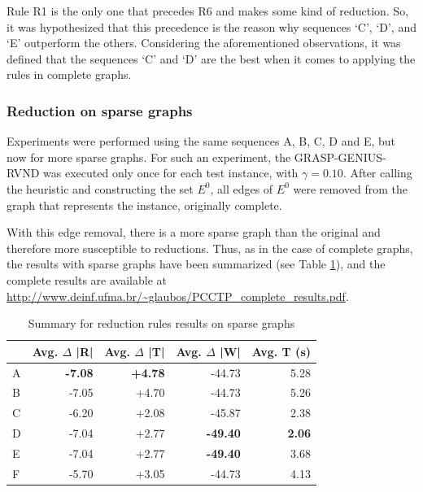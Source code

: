 \documentclass{singlecol-new}
\theoremstyle{TH}{
\newtheorem{lemma}{Lemma}
\newtheorem{theorem}[lemma]{Theorem}
\newtheorem{corrolary}[lemma]{Corrolary}
\newtheorem{conjecture}[lemma]{Conjecture}
\newtheorem{proposition}[lemma]{Proposition}
\newtheorem{claim}[lemma]{Claim}
\newtheorem{stheorem}[lemma]{Wrong Theorem}
}
\theoremstyle{THrm}{
\newtheorem{definition}{Definition}[section]
\newtheorem{question}{Question}[section]
\newtheorem{remark}{Remark}
\newtheorem{scheme}{Scheme}
}
\theoremstyle{THhit}{
\newtheorem{case}{Case}[section]
}
\begin{document}
 Rule R1 is the only one that precedes R6 and makes some kind of reduction. So, it was hypothesized that this precedence is the reason why sequences `C', `D', and `E' outperform the others. Considering the aforementioned observations, it was defined that the sequences `C' and `D' are the best when it comes to applying the rules in complete graphs.

\subsubsection{Reduction on sparse graphs}

Experiments were performed using the same sequences A, B, C, D and E, but now for more sparse graphs. For such an experiment, the GRASP-GENIUS-RVND was executed only once for each test instance, with $\gamma = 0.10$. After calling the heuristic and constructing the set $ E^0 $, all edges of $ E^0 $ were removed from the graph that represents the instance, originally complete.

With this edge removal, there is a more sparse graph than the original and therefore more susceptible to reductions. Thus, as in the case of complete graphs, the results with sparse graphs have been summarized (see Table \ref{tab:sum-rr-sparse}), and the complete results are available at \url{http://www.deinf.ufma.br/~glaubos/PCCTP_complete_results.pdf}.

\begin{table}[!h]
	\centering
	\caption{Summary for reduction rules results on sparse graphs}
	\label{tab:sum-rr-sparse}
	{\footnotesize
	\begin{tabular}{lrrrr}
		\hline
		& Avg. $\Delta$ |R| & Avg. $\Delta$ |T| & Avg. $\Delta$ |W| & Avg. T (s) \\
		\hline
	A & \textbf{-7.08} & \textbf{+4.78} & -44.73          & 5.28          \\
	B & -7.05          & +4.70          & -44.73          & 5.26          \\
	C & -6.20          & +2.08          & -45.87          & 2.38          \\
	D & -7.04          & +2.77          & \textbf{-49.40} & \textbf{2.06} \\
	E & -7.04          & +2.77          & \textbf{-49.40} & 3.68          \\
	F & -5.70          & +3.05          & -44.73          & 4.13         \\
		\hline    
	\end{tabular}
}
\end{table}
\end{document}
